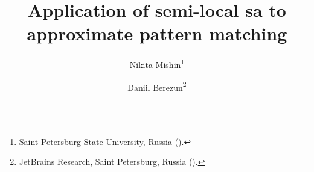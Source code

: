 

\usepackage{lipsum}
\usepackage{amsfonts}
\usepackage{graphicx}
\usepackage{epstopdf}
\usepackage{algorithmic}
\ifpdf
\else
\fi

\newcommand{\creflastconjunction}{, and~}



\title{Application of semi-local sa to approximate pattern matching
}

\author{Nikita Mishin\thanks{Saint Petersburg State University, Russia
    ().}
\and Daniil Berezun\thanks{JetBrains Research, Saint Petersburg, Russia
  ().}}

\usepackage{amsopn}
\DeclareMathOperator{\diag}{diag}


